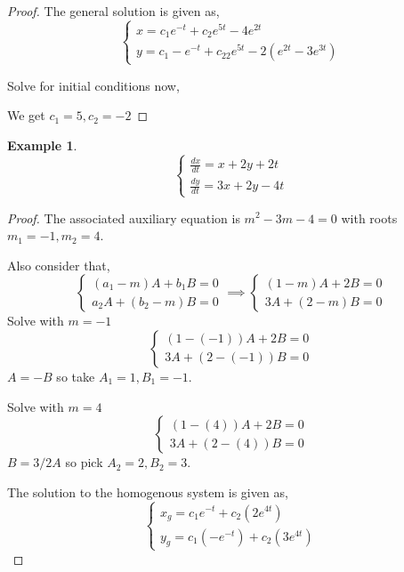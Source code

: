 \documentclass[oneside,11pt,pdftex,final]{book}%
\numberwithin{equation}{section}
\newtheorem{example}[theorem]{Example}
\numberwithin{section}{chapter}
\numberwithin{equation}{chapter}
\begin{document}
\begin{proof}
The general solution is given as,
\[ \begin{cases}
	x=c_1e^{-t}+c_2e^{5t}-4e^{2t}\\
	y=c_1-e^{-t}+c_22e^{5t}-2(e^{2t}-3e^{3t})
\end{cases} \]

Solve for initial conditions now,

We get $ c_1=5,c_2=-2$
\end{proof}

\begin{example}
	\[ \begin{cases}
		\frac{dx}{dt}=x+2y+2t\\
		\frac{dy}{dt}=3x+2y-4t
	\end{cases} \]
\end{example}
\begin{proof}
	The associated auxiliary equation is 
	$ m^2-3m-4=0 $ with roots $ m_1=-1, m_2=4 $.
	
	Also consider that,
	\[ \begin{cases}
		(a_1-m)A+b_1B=0\\
		a_2A+(b_2-m)B=0
	\end{cases} \implies 
	\begin{cases}
		(1-m)A+2B=0\\
		3A+(2-m)B=0
	\end{cases}\]
Solve with $ m=-1 $
\[ \begin{cases}
	(1-(-1))A+2B=0\\
	3A+(2-(-1))B=0
\end{cases} \]
$ A=-B $ so take $ A_1=1,B_1=-1 $.

Solve with $ m=4 $
\[ \begin{cases}
	(1-(4))A+2B=0\\
	3A+(2-(4))B=0
\end{cases} \]
$ B=3/2A $ so pick $ A_2=2, B_2=3 $.

The solution to the homogenous system is given as,
\[ \begin{cases}
	x_g=c_1e^{-t}+c_2(2e^{4t})\\
	y_g=c_1(-e^{-t})+c_2(3e^{4t})
\end{cases} \]


\end{proof}
\end{document}
